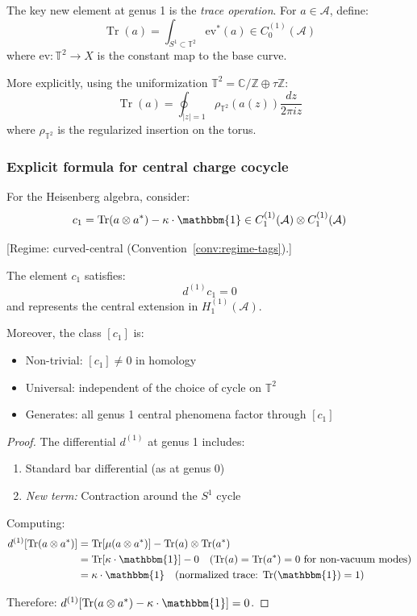 The key new element at genus 1 is the \emph{trace operation}. For $a \in \mathcal{A}$,
define:
\[\operatorname{Tr}(a) = \int_{S^1 \subset \mathbb{T}^2} \mathrm{ev}^*(a) \in C_0^{(1)}(\mathcal{A})\]
where $\mathrm{ev}: \mathbb{T}^2 \to X$ is the constant map to the base curve.

More explicitly, using the uniformization $\mathbb{T}^2 = \mathbb{C}/\mathbb{Z} \oplus \tau \mathbb{Z}$:
\[\operatorname{Tr}(a) = \oint_{|z| = 1} \rho_{\mathbb{T}^2}(a(z)) \frac{dz}{2\pi i z}\]
where $\rho_{\mathbb{T}^2}$ is the regularized insertion on the torus.

\subsubsection{Explicit formula for central charge cocycle}

For the Heisenberg algebra, consider:
\[c_1 = \operatorname{Tr}(a \otimes a^*) - \kappa \cdot \mathbbm{1} 
\in C_1^{(1)}(\mathcal{A}) \otimes C_1^{(1)}(\mathcal{A})\]

\begin{theorem}\label{thm:central-charge-cocycle}
\textup{[Regime: curved-central
\textup{(}Convention~\textup{\ref{conv:regime-tags})}.]}

The element $c_1$ satisfies:
\[d^{(1)} c_1 = 0\]
and represents the central extension in $H_1^{(1)}(\mathcal{A})$.

Moreover, the class $[c_1]$ is:
\begin{itemize}
\item Non-trivial: $[c_1] \neq 0$ in homology
\item Universal: independent of the choice of cycle on $\mathbb{T}^2$
\item Generates: all genus 1 central phenomena factor through $[c_1]$
\end{itemize}
\end{theorem}

\begin{proof}
The differential $d^{(1)}$ at genus 1 includes:
\begin{enumerate}
\item Standard bar differential (as at genus 0)
\item \emph{New term:} Contraction around the $S^1$ cycle
\end{enumerate}

Computing:
\begin{align}
d^{(1)}[\operatorname{Tr}(a \otimes a^*)] 
&= \operatorname{Tr}[\mu(a \otimes a^*)] - \operatorname{Tr}(a) \otimes \operatorname{Tr}(a^*) \\
&= \operatorname{Tr}[\kappa \cdot \mathbbm{1}] - 0 \quad \text{($\operatorname{Tr}(a) = \operatorname{Tr}(a^*) = 0$ for non-vacuum modes)} \\
&= \kappa \cdot \mathbbm{1} \quad \text{(normalized trace: $\operatorname{Tr}(\mathbbm{1}) = 1$)}
\end{align}

Therefore: $d^{(1)}[\operatorname{Tr}(a \otimes a^*) - \kappa \cdot \mathbbm{1}] = 0$.
\end{proof}

